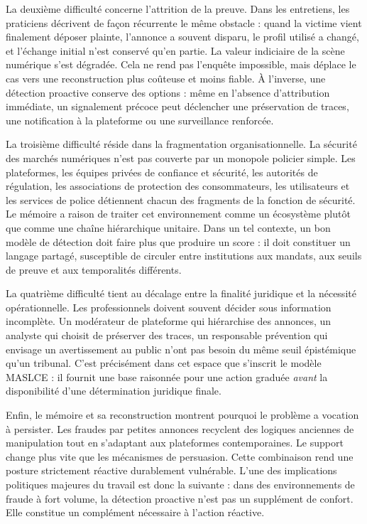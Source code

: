 \documentclass[10pt,a4paper]{article}
\begin{document}
La deuxième difficulté concerne l'attrition de la preuve. Dans les entretiens, les praticiens décrivent de façon récurrente le même obstacle : quand la victime vient finalement déposer plainte, l'annonce a souvent disparu, le profil utilisé a changé, et l'échange initial n'est conservé qu'en partie. La valeur indiciaire de la scène numérique s'est dégradée. Cela ne rend pas l'enquête impossible, mais déplace le cas vers une reconstruction plus coûteuse et moins fiable. À l'inverse, une détection proactive conserve des options : même en l'absence d'attribution immédiate, un signalement précoce peut déclencher une préservation de traces, une notification à la plateforme ou une surveillance renforcée.

La troisième difficulté réside dans la fragmentation organisationnelle. La sécurité des marchés numériques n'est pas couverte par un monopole policier simple. Les plateformes, les équipes privées de confiance et sécurité, les autorités de régulation, les associations de protection des consommateurs, les utilisateurs et les services de police détiennent chacun des fragments de la fonction de sécurité. Le mémoire a raison de traiter cet environnement comme un écosystème plutôt que comme une chaîne hiérarchique unitaire. Dans un tel contexte, un bon modèle de détection doit faire plus que produire un score : il doit constituer un langage partagé, susceptible de circuler entre institutions aux mandats, aux seuils de preuve et aux temporalités différents.

La quatrième difficulté tient au décalage entre la finalité juridique et la nécessité opérationnelle. Les professionnels doivent souvent décider sous information incomplète. Un modérateur de plateforme qui hiérarchise des annonces, un analyste qui choisit de préserver des traces, un responsable prévention qui envisage un avertissement au public n'ont pas besoin du même seuil épistémique qu'un tribunal. C'est précisément dans cet espace que s'inscrit le modèle MASLCE : il fournit une base raisonnée pour une action graduée \emph{avant} la disponibilité d'une détermination juridique finale.

Enfin, le mémoire et sa reconstruction montrent pourquoi le problème a vocation à persister. Les fraudes par petites annonces recyclent des logiques anciennes de manipulation tout en s'adaptant aux plateformes contemporaines. Le support change plus vite que les mécanismes de persuasion. Cette combinaison rend une posture strictement réactive durablement vulnérable. L'une des implications politiques majeures du travail est donc la suivante : dans des environnements de fraude à fort volume, la détection proactive n'est pas un supplément de confort. Elle constitue un complément nécessaire à l'action réactive.
\end{document}
